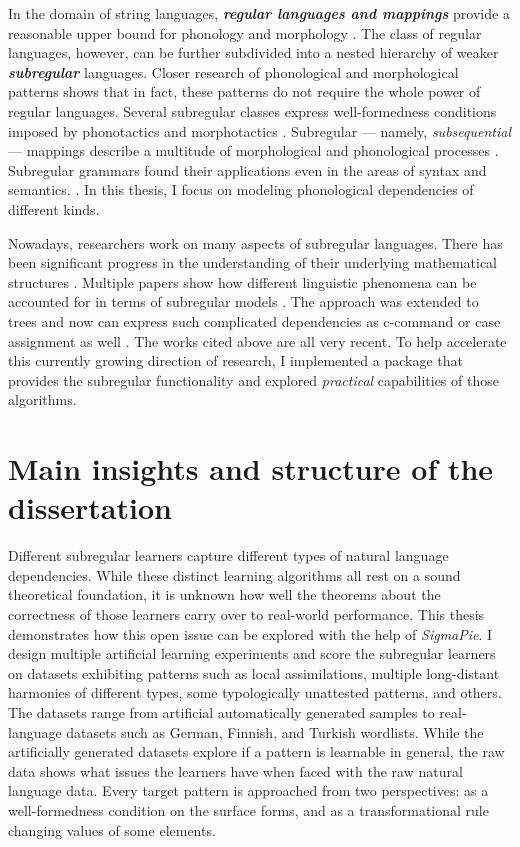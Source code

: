 In the domain of string languages, \textbf{\emph{regular languages and mappings}} provide a reasonable upper bound for phonology and morphology \citep{Johnson1972,Koskenniemi1983,KaplanKay94,BeesleyKartunnen03}.
The class of regular languages, however, can be further subdivided into a nested hierarchy of weaker \textbf{\emph{subregular}} languages.
Closer research of phonological and morphological patterns shows that in fact, these patterns do not require the whole power of regular languages.
Several subregular classes express well-formedness conditions imposed by phonotactics and morphotactics \citep{HeinzRawal11,AksenovaEtAl16,Heinz-2018-CNPG}.
Subregular --- namely, \emph{subsequential} --- mappings describe a multitude of morphological and phonological processes \citep{Chandlee2017,ChandleeHeinz2018}.
Subregular grammars found their applications even in the areas of syntax and semantics. \citep{DeSantoGrafDrury2017,GrafShafiei19SCiL,Graf19AC}.
In this thesis, I focus on modeling phonological dependencies of different kinds.


Nowadays, researchers work on many aspects of subregular languages.
There has been significant progress in the understanding of their underlying mathematical structures \citep{Fu2011,HeinzRogers2013}.
Multiple papers show how different linguistic phenomena can be accounted for in terms of subregular models \citep{HeinzRawal11,Heinz-Lai-2013-VHS,Chandlee2014,AksenovaEtAl16,DolatianHeinz2018,Graf19AC,Karakas2020}.
The approach was extended to trees and now can express such complicated dependencies as c-command or case assignment as well  \citep{GrafShafiei19SCiL,VuEtAl19SCiL}.
The works cited above are all very recent.
To help accelerate this currently growing direction of research, I implemented a package that provides the subregular functionality and explored \emph{practical} capabilities of those algorithms.


\section{Main insights and structure of the dissertation}

Different subregular learners capture different types of natural language dependencies.
While these distinct learning algorithms all rest on a sound theoretical foundation, it is unknown how well the theorems about the correctness of those learners carry over to real-world performance.
This thesis demonstrates how this open issue can be explored with the help of \emph{SigmaPie}.
I design multiple artificial learning experiments and score the subregular learners on datasets exhibiting patterns such as local assimilations, multiple long-distant harmonies of different types, some typologically unattested patterns, and others.
The datasets range from artificial automatically generated samples to real-language datasets such as German, Finnish, and Turkish wordlists.
While the artificially generated datasets explore if a pattern is learnable in general, the raw data shows what issues the learners have when faced with the raw natural language data.
Every target pattern is approached from two perspectives: as a well-formedness condition on the surface forms, and as a transformational rule changing values of some elements.


